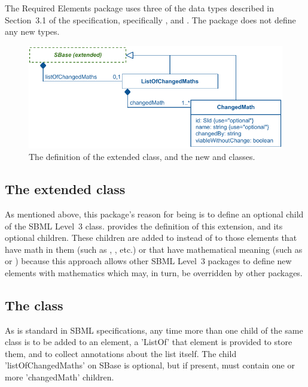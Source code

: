 The Required Elements package uses three of the data types described in Section~3.1 of the \sbmlthreecore specification, specifically ,  and .  The package does not define any new types.


\begin{figure}[bh]
  \includegraphics{figs/extended-sbase-req-uml}
  \vspace*{-0.0em}
  \caption{The definition of the extended \SBase class, and the new \ListOfChangedMaths and \ChangedMath classes.}
  \label{extended-sbase-uml}
\end{figure}

\subsection{The extended  class}
\label{extended-sbase-class}

As mentioned above, this package's reason for being is to define an optional child of the SBML Level~3 \SBase class.   provides the definition of this \SBase extension, and its optional \ChangedMath children.  These children are added to \SBase instead of to those elements that have math in them (such as \InitialAssignment, \KineticLaw, etc.) or that have mathematical meaning (such as \Parameter or \Species) because this approach allows other SBML Level~3 packages to define new elements with mathematics which may, in turn, be overridden by other packages.

\subsection{The  class}
\label{listofchangedMaths-class}

As is standard in SBML specifications, any time more than one child of the same class is to be added to an element, a 'ListOf' that element is provided to store them, and to collect annotations about the list itself.  The child 'listOfChangedMaths' on SBase is optional, but if present, must contain one or more 'changedMath' children.

